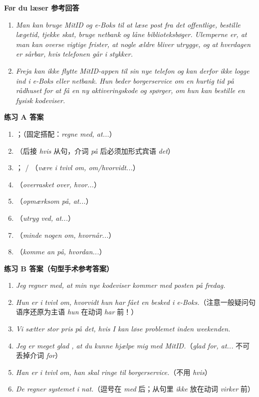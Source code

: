 \begin{answerbox}
\textbf{Før du læser 参考回答}
\begin{enumerate}
  \item \textit{Man kan bruge MitID og e-Boks til at læse post fra det offentlige, bestille lægetid, tjekke skat, bruge netbank og låne biblioteksbøger. Ulemperne er, at man kan overse vigtige frister, at nogle ældre bliver utrygge, og at hverdagen er sårbar, hvis telefonen går i stykker.}
  \item \textit{Freja kan ikke flytte MitID-appen til sin nye telefon og kan derfor ikke logge ind i e-Boks eller netbank. Hun beder borgerservice om en hurtig tid på rådhuset for at få en ny aktiveringskode og spørger, om hun kan bestille en fysisk kodeviser.}
\end{enumerate}

\textbf{练习 A 答案}
\begin{enumerate}
  \item {}；（固定搭配：\textit{regne med, at...}）
  \item {}（后接 \textit{hvis} 从句，介词 \textit{på} 后必须加形式宾语 \textit{det}）
  \item {}； / （\textit{være i tvivl om, om/hvorvidt...}）
  \item {}（\textit{overrasket over, hvor...}）
  \item {}（\textit{opmærksom på, at...}）
  \item {}（\textit{utryg ved, at...}）
  \item {}（\textit{minde nogen om, hvornår...}）
  \item {}（\textit{komme an på, hvordan...}）
\end{enumerate}

\textbf{练习 B 答案（句型手术参考答案）}
\begin{enumerate}
  \item \textit{Jeg regner med, at min nye kodeviser kommer med posten på fredag.}
  \item \textit{Hun er i tvivl om, hvorvidt hun har fået en besked i e-Boks.}（注意一般疑问句语序还原为主语 \textit{hun} 在动词 \textit{har} 前！）
  \item \textit{Vi sætter stor pris på det, hvis I kan løse problemet inden weekenden.}
  \item \textit{Jeg er meget glad , at du kunne hjælpe mig med MitID.}（\textit{glad for, at...} 不可丢掉介词 \textit{for}）
  \item \textit{Han er i tvivl om,  han skal ringe til borgerservice.}（不用 \textit{hvis}）
  \item \textit{De regner  systemet  i nat.}（逗号在 \textit{med} 后；从句里 \textit{ikke} 放在动词 \textit{virker} 前）
\end{enumerate}


\end{answerbox}
